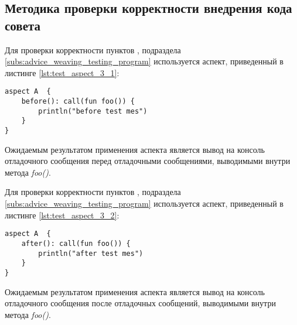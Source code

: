 \subsection{Методика проверки корректности внедрения кода совета}
\label{sub:advice_weaving_methodology}
Для проверки корректности пунктов \quotes{\ref{list:before_advice_weaving_check}},
\quotes{\ref{list:program_work_check}}  подраздела \ref{subs:advice_weaving_testing_program} используется аспект, приведенный в листинге \ref{lst:test_aspect_3_1}:
\begin{lstlisting}[style={java}, label={lst:test_aspect_3_1},
  caption={Пример тестового аспекта}]
aspect A  {
    before(): call(fun foo()) {
        println("before test mes")
    }
}
\end{lstlisting}
Ожидаемым результатом применения аспекта является  вывод на консоль отладочного сообщения  перед отладочными сообщениями, выводимыми внутри метода \textit{foo()}.

Для проверки корректности пунктов \quotes{\ref{list:after_advice_weaving_check}},
\quotes{\ref{list:program_work_check}}  подраздела \ref{subs:advice_weaving_testing_program} используется аспект, приведенный в листинге \ref{lst:test_aspect_3_2}:
\begin{lstlisting}[style={java}, label={lst:test_aspect_3_2},
  caption={Пример тестового аспекта}]
aspect A  {
    after(): call(fun foo()) {
        println("after test mes")
    }
}
\end{lstlisting}
Ожидаемым результатом применения аспекта является вывод на консоль отладочного сообщения  после отладочных сообщений, выводимыми внутри метода \textit{foo()}.

